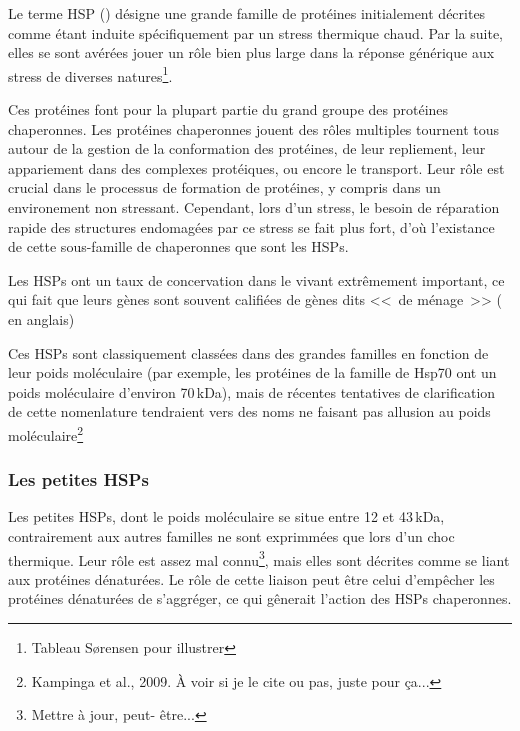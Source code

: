 \cite{federhoffmann1999, zhang2011}

Le terme HSP () désigne une grande famille de
protéines initialement décrites comme étant induite spécifiquement par un
stress thermique chaud. Par la suite, elles se sont avérées jouer un rôle bien
plus large dans la réponse générique aux stress de diverses
natures\cite{sorensen2003}\footnote{Tableau Sørensen pour illustrer}.


Ces protéines font pour la plupart partie du grand groupe des protéines chaperonnes. Les
protéines chaperonnes jouent des rôles multiples tournent tous autour de la
gestion de la conformation des protéines, de leur repliement, leur appariement
dans des complexes protéiques, ou encore le transport.  Leur rôle est crucial
dans le processus de formation de protéines, y compris dans un environement
non stressant. Cependant, lors d'un stress, le besoin de réparation rapide des
structures endomagées par ce stress se fait plus fort, d'où l'existance de
cette sous-famille de chaperonnes que sont les HSPs.


Les HSPs ont un taux de concervation dans le vivant extrêmement important, ce
qui fait que leurs gènes sont souvent califiées de gènes dits <<~de ménage~>>
( en anglais)


Ces HSPs sont classiquement classées dans des grandes familles en fonction de
leur poids moléculaire (par exemple, les protéines de la famille de Hsp70 ont
un poids moléculaire d'environ 70\,kDa), mais de récentes tentatives de
clarification de cette nomenlature tendraient vers des noms ne faisant pas
allusion au poids moléculaire\footnote{Kampinga et al., 2009. À voir si je le
cite ou pas, juste pour ça...}

\subsubsection{Les petites HSPs} %
\label{ssub:les_petites_hsps}

  Les petites HSPs, dont le poids moléculaire se situe entre 12 et 43\,kDa,
  contrairement aux autres familles ne sont exprimmées que lors d'un choc
  thermique. Leur rôle est assez mal connu\footnote{Mettre à jour, peut-
  être...}, mais elles sont décrites comme se liant aux protéines dénaturées.
  Le rôle de cette liaison peut être celui d'empêcher les protéines dénaturées
  de s'aggréger, ce qui gênerait l'action des HSPs chaperonnes.

